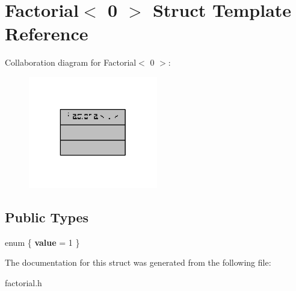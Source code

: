 \hypertarget{structFactorial_3_010_01_4}{\section{Factorial$<$ 0 $>$ Struct Template Reference}
\label{structFactorial_3_010_01_4}
}


Collaboration diagram for Factorial$<$ 0 $>$\-:
\nopagebreak
\begin{figure}[H]
\begin{center}
\leavevmode
\includegraphics[width=160pt]{structFactorial_3_010_01_4__coll__graph}
\end{center}
\end{figure}
\subsection*{Public Types}
\begin{DoxyCompactItemize}
\item 
enum \{ {\bfseries value} = 1
 \}
\end{DoxyCompactItemize}


The documentation for this struct was generated from the following file\-:\begin{DoxyCompactItemize}
\item 
factorial.\-h\end{DoxyCompactItemize}
